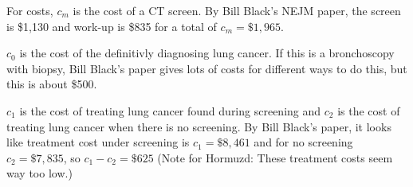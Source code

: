 \documentclass[11pt]{article}
\begin{document}

For costs, $c_m$ is the cost of a CT screen.  By Bill Black's NEJM paper, the screen is \$1,130 and work-up is \$835 for a total of $c_m=\$1,965$.

$c_0$ is the cost of the definitivly diagnosing lung cancer.  If this is a bronchoscopy with biopsy, Bill Black's paper gives lots of costs for different ways to do this, but this is about \$500.

$c_1$ is the cost of treating lung cancer found during screening and $c_2$ is the cost of treating lung cancer when there is no screening.  By Bill Black's paper, it looks like treatment cost under screening is $c_1=\$8,461$ and for no screening $c_2=\$7,835$, so $c_1-c_2=\$625$  (Note for Hormuzd: These treatment costs seem way too low.)


\end{document}
